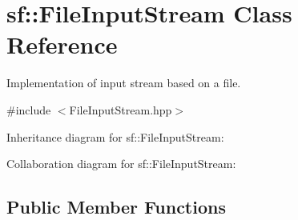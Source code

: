 \hypertarget{classsf_1_1_file_input_stream}{}\section{sf\+:\+:File\+Input\+Stream Class Reference}
\label{classsf_1_1_file_input_stream}


Implementation of input stream based on a file.  




{\ttfamily \#include $<$File\+Input\+Stream.\+hpp$>$}



Inheritance diagram for sf\+:\+:File\+Input\+Stream\+:


Collaboration diagram for sf\+:\+:File\+Input\+Stream\+:
\subsection*{Public Member Functions}
